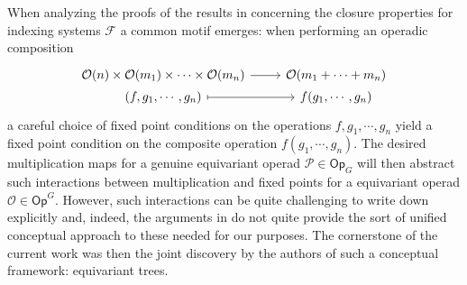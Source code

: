 \documentclass[a4paper,10pt]{article}%
\begin{document}
When analyzing the proofs of the results in 
\cite[\S 4]{BH15}
concerning the closure properties for indexing systems $\mathcal F$
a common motif emerges:
when performing an operadic composition
\begin{equation}
\begin{tikzcd}[row sep=0]
	\O(n) \times \O(m_1) \times \cdots \times \O(m_n) \ar{r} &
	\O(m_1 + \cdots + m_n)
\\
	(f,g_1,\cdots,g_n) \ar[mapsto]{r} &
	f(g_1,\cdots,g_n)
\end{tikzcd}
\end{equation}
a careful choice of fixed point conditions on the operations $f,g_1,\cdots,g_n$ 
yield a fixed point condition on the composite operation
$f(g_1,\cdots,g_n)$.
The desired multiplication maps for a genuine equivariant operad
$\mathcal{P} \in \mathsf{Op}_G$
will then abstract such interactions between multiplication and fixed points for a equivariant operad 
$\mathcal{O} \in \mathsf{Op}^G$.
However, such interactions can be quite challenging to write down explicitly and, indeed, 
the arguments in \cite[\S 4]{BH15}
do not quite provide the sort of unified conceptual approach
to these needed for our purposes.
The cornerstone of the current work was then the 
joint discovery by the authors of
such a conceptual framework: equivariant trees.
\end{document}
